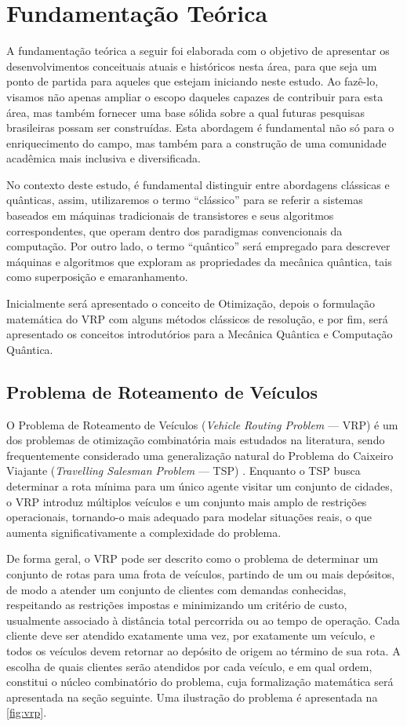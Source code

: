 \chapter{Fundamentação Teórica}

A fundamentação teórica a seguir foi elaborada com o objetivo de apresentar os desenvolvimentos conceituais atuais e históricos nesta área, para que seja um ponto de partida para aqueles que estejam iniciando neste estudo. Ao fazê-lo, visamos não apenas ampliar o escopo daqueles capazes de contribuir para esta área, mas também fornecer uma base sólida sobre a qual futuras pesquisas brasileiras possam ser construídas. Esta abordagem é fundamental não só para o enriquecimento do campo, mas também para a construção de uma comunidade acadêmica mais inclusiva e diversificada.

No contexto deste estudo, é fundamental distinguir entre abordagens clássicas e quânticas, assim, utilizaremos o termo ``clássico'' para se referir a sistemas baseados em máquinas tradicionais de transistores e seus algoritmos correspondentes, que operam dentro dos paradigmas convencionais da computação. Por outro lado, o termo ``quântico'' será empregado para descrever máquinas e algoritmos que exploram as propriedades da mecânica quântica, tais como superposição e emaranhamento.

Inicialmente será apresentado o conceito de Otimização, depois o formulação matemática do VRP com alguns métodos clássicos de resolução, e por fim, será apresentado os conceitos introdutórios para a Mecânica Quântica e Computação Quântica.

\section{Problema de Roteamento de Veículos}

O Problema de Roteamento de Veículos (\textit{Vehicle Routing Problem} — VRP) é um dos problemas de otimização combinatória mais estudados na literatura, sendo frequentemente considerado uma generalização natural do Problema do Caixeiro Viajante (\textit{Travelling Salesman Problem} — TSP) \cite{gavish1978travelling}. Enquanto o TSP busca determinar a rota mínima para um único agente visitar um conjunto de cidades, o VRP introduz múltiplos veículos e um conjunto mais amplo de restrições operacionais, tornando-o mais adequado para modelar situações reais, o que aumenta significativamente a complexidade do problema.

De forma geral, o VRP pode ser descrito como o problema de determinar um conjunto de rotas para uma frota de veículos, partindo de um ou mais depósitos, de modo a atender um conjunto de clientes com demandas conhecidas, respeitando as restrições impostas e minimizando um critério de custo, usualmente associado à distância total percorrida ou ao tempo de operação. Cada cliente deve ser atendido exatamente uma vez, por exatamente um veículo, e todos os veículos devem retornar ao depósito de origem ao término de sua rota. A escolha de quais clientes serão atendidos por cada veículo, e em qual ordem, constitui o núcleo combinatório do problema, cuja formalização matemática será apresentada na seção seguinte. Uma ilustração do problema é apresentada na \autoref{fig:vrp}.

